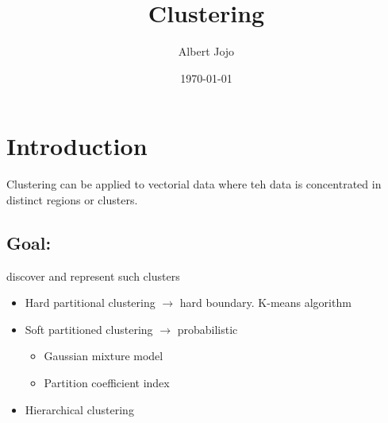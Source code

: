 \documentclass{article}
\title{Clustering}
\author{Albert Jojo}
\date{\today}
\begin{document}
\maketitle

\section*{Introduction}
Clustering can be applied to vectorial data where teh data is concentrated in distinct regions or clusters.

\subsection*{Goal:} discover and represent such clusters
\begin{itemize}
    \item Hard partitional clustering $\rightarrow$ hard boundary. K-means algorithm
    \item Soft partitioned clustering $\rightarrow$ probabilistic
    \begin{itemize}
        \item Gaussian mixture model
        \item Partition coefficient index
    \end{itemize}
    \item Hierarchical clustering
\end{itemize}
\end{document}
